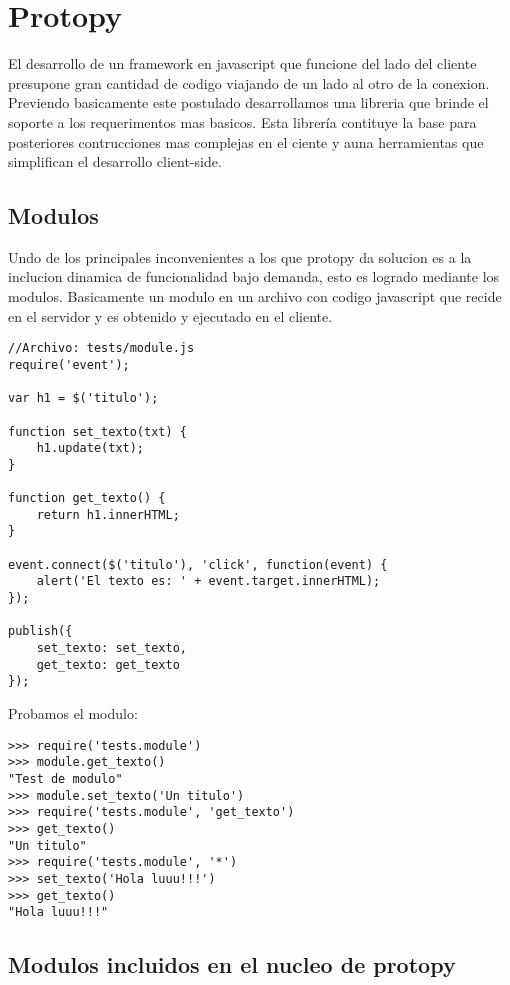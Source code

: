 \chapter{Protopy}
El desarrollo de un framework en javascript que funcione del lado del cliente
presupone gran cantidad de codigo
viajando de un lado al otro de la conexion. Previendo basicamente este postulado
desarrollamos una libreria
que brinde el soporte a los requerimentos mas basicos.
Esta librería contituye la base para posteriores contrucciones mas complejas en
el ciente y auna herramientas
que simplifican el desarrollo client-side.

\section{Modulos}
Undo de los principales inconvenientes a los que protopy da solucion es a la
inclucion dinamica de funcionalidad bajo demanda,
esto es logrado mediante los modulos.
Basicamente un modulo en un archivo con codigo javascript que recide en el
servidor y es obtenido y ejecutado en el cliente.

\begin{lstlisting}[style=javascript,label=estructura-modulo,caption=Estructura
de un modulo]
//Archivo: tests/module.js
require('event');

var h1 = $('titulo');

function set_texto(txt) {
    h1.update(txt);
}

function get_texto() {
    return h1.innerHTML;
}

event.connect($('titulo'), 'click', function(event) {
    alert('El texto es: ' + event.target.innerHTML);
});

publish({
    set_texto: set_texto,
    get_texto: get_texto
});
\end{lstlisting}

\noindent
Probamos el modulo:
\begin{lstlisting}[style=consola]
>>> require('tests.module')
>>> module.get_texto()
"Test de modulo"
>>> module.set_texto('Un titulo')
>>> require('tests.module', 'get_texto')
>>> get_texto()
"Un titulo"
>>> require('tests.module', '*')
>>> set_texto('Hola luuu!!!')
>>> get_texto()
"Hola luuu!!!"
\end{lstlisting}

\section{Modulos incluidos en el nucleo de protopy}
